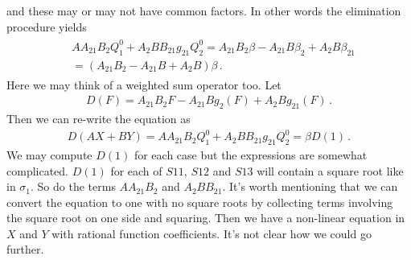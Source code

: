 and these may or may not have common factors. In other words the elimination procedure yields
\begin{align}
\begin{split}
	&AA_{21}B_2 Q_1^{0} + A_2BB_{21}g_{21}Q_2^{0} =A_{21}B_2\beta-A_{21}B \beta_2 + A_2 B \beta_{21}\\
	&=(A_{21}B_2-A_{21}B+A_2B)\beta \,.
\end{split}	
\end{align}
Here we may think of a weighted sum operator too. Let
\begin{align}
	D(F) = A_{21}B_2 F - A_{21}B g_2(F) + A_2B g_{21}(F) \,.
\end{align}
Then we can re-write the equation as
\begin{align}
	D(AX+BY) = AA_{21}B_2 Q_1^{0} + A_2BB_{21}g_{21}Q_2^{0} = \beta D(1)\,.
\end{align}
We may compute $D(1)$ for each case but the expressions are somewhat complicated. $D(1)$ for each of $S11$, $S12$ and $S13$ will contain a square root like in $\sigma_1$. So do the terms $AA_{21}B_2$ and $A_2BB_{21}$. It's worth mentioning that we can convert the equation to one with no square roots by collecting terms involving the square root on one side and squaring. Then we have a non-linear equation in $X$ and $Y$ with rational function coefficients. It's not clear how we could go further.
